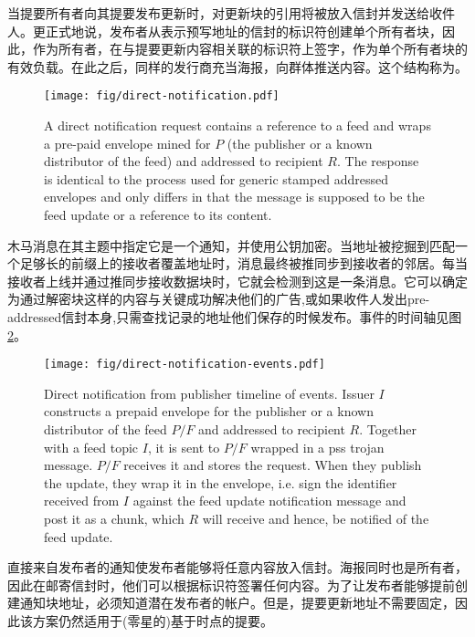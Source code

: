 当提要所有者向其提要发布更新时，对更新块的引用将被放入信封并发送给收件人。更正式地说，发布者从表示预写地址的信封的标识符创建单个所有者块，因此，作为所有者，在与提要更新内容相关联的标识符上签字，作为单个所有者块的有效负载。在此之后，同样的发行商充当海报，向群体推送内容。这个结构称为。 

\begin{figure}[htbp]
   \centering
   \texttt{[image: fig/direct-notification.pdf]}
   \caption[Direct notification request and response \statusgreen]{A direct notification request contains a reference to a feed and wraps a pre-paid envelope mined for $P$ (the publisher or a known distributor of the feed) and addressed to recipient $R$. The response is identical to the process used for generic stamped addressed envelopes and only differs in that the message is supposed to be the feed update or a reference to its content.}
   \label{fig:direct-notification}
\end{figure}

木马消息在其主题中指定它是一个通知，并使用公钥加密。当地址被挖掘到匹配一个足够长的前缀上的接收者覆盖地址时，消息最终被推同步到接收者的邻居。每当接收者上线并通过推同步接收数据块时，它就会检测到这是一条消息。它可以确定为通过解密块这样的内容与关键成功解决他们的广告,或如果收件人发出pre-addressed信封本身,只需查找记录的地址他们保存的时候发布。事件的时间轴见图\ref{fig:direct-notification-events}。


\begin{figure}[htbp]
   \centering
    \texttt{[image: fig/direct-notification-events.pdf]}
   \caption[Direct notification from publisher timeline of events \statusgreen]{Direct notification from publisher timeline of events. Issuer $I$ constructs a prepaid envelope for the publisher or a known distributor of the feed $P/F$ and addressed to recipient $R$. Together with a feed topic $I$, it is sent to $P/F$ wrapped in a pss trojan message. $P/F$ receives it and stores the request. When they publish the update, they wrap it in the envelope, i.e. sign the identifier received from $I$ against the feed update notification message and post it as a chunk, which $R$ will receive and hence, be notified of the feed update. }
   \label{fig:direct-notification-events}
\end{figure}


直接来自发布者的通知使发布者能够将任意内容放入信封。海报同时也是所有者，因此在邮寄信封时，他们可以根据标识符签署任何内容。为了让发布者能够提前创建通知块地址，必须知道潜在发布者的帐户。但是，提要更新地址不需要固定，因此该方案仍然适用于(零星的)基于时点的提要。

